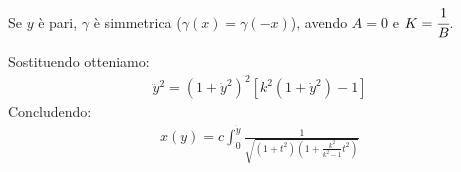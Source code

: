 Se $y$ è pari, $\gamma$ è simmetrica ($\gamma(x)=\gamma(-x)$), avendo $A=0$ e $K=\cfrac{1}{B}$.

Sostituendo otteniamo:
\begin{align*}
    \ddot{y}^2=(1+\dot{y}^2)^2[k^2(1+\dot{y}^2)-1]
\end{align*}
Concludendo:
\begin{align*}
    x(y)=c \int^{\dot{y}}_0 \frac{1}{\sqrt{(1+t^2)(1+\frac{k^2}{k^2-1}t^2)}} 
\end{align*}